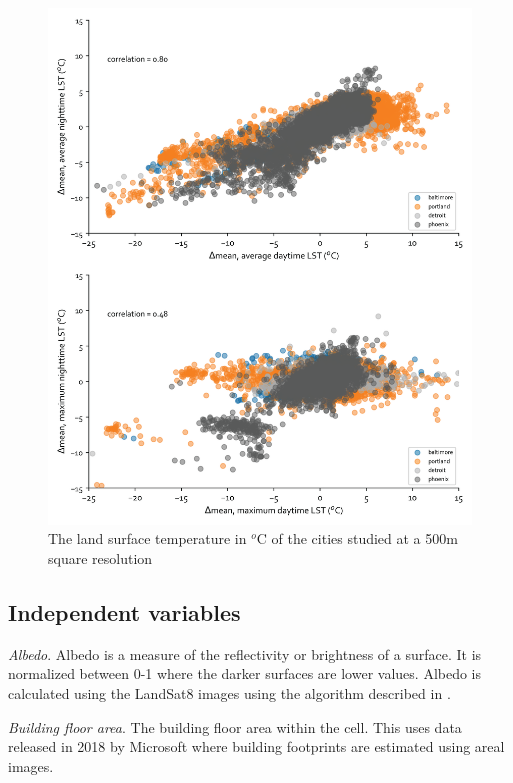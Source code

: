 \documentclass[final,3p,times,twocolumn,sort&compress]{elsarticle}
\begin{document}
\begin{figure}
    \begin{center}
    \includegraphics[width=\linewidth]{fig/report/scatter_500.png}
    \caption{The land surface temperature in $^o$C of the cities studied at a 500m square resolution}
    \label{fig:scatter_lst}
    \end{center}
\end{figure}

\subsection{Independent variables}

\textit{Albedo}. Albedo is a measure of the reflectivity or brightness of a surface. It is normalized between 0-1 where the darker surfaces are lower values. Albedo is calculated using the LandSat8 images using the algorithm described in \cite{Smith2010-nw, Liang2001-jd}. 

\textit{Building floor area}. The building floor area within the cell. This uses data released in 2018 by Microsoft where building footprints are estimated using areal images. 
\end{document}
